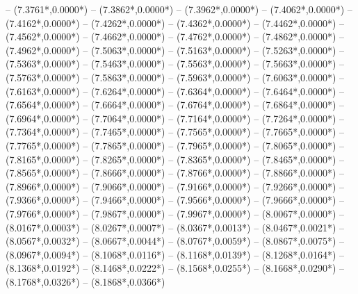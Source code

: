 {	-- ({7.3761*\dx},{0.0000*\dy})
	-- ({7.3862*\dx},{0.0000*\dy})
	-- ({7.3962*\dx},{0.0000*\dy})
	-- ({7.4062*\dx},{0.0000*\dy})
	-- ({7.4162*\dx},{0.0000*\dy})
	-- ({7.4262*\dx},{0.0000*\dy})
	-- ({7.4362*\dx},{0.0000*\dy})
	-- ({7.4462*\dx},{0.0000*\dy})
	-- ({7.4562*\dx},{0.0000*\dy})
	-- ({7.4662*\dx},{0.0000*\dy})
	-- ({7.4762*\dx},{0.0000*\dy})
	-- ({7.4862*\dx},{0.0000*\dy})
	-- ({7.4962*\dx},{0.0000*\dy})
	-- ({7.5063*\dx},{0.0000*\dy})
	-- ({7.5163*\dx},{0.0000*\dy})
	-- ({7.5263*\dx},{0.0000*\dy})
	-- ({7.5363*\dx},{0.0000*\dy})
	-- ({7.5463*\dx},{0.0000*\dy})
	-- ({7.5563*\dx},{0.0000*\dy})
	-- ({7.5663*\dx},{0.0000*\dy})
	-- ({7.5763*\dx},{0.0000*\dy})
	-- ({7.5863*\dx},{0.0000*\dy})
	-- ({7.5963*\dx},{0.0000*\dy})
	-- ({7.6063*\dx},{0.0000*\dy})
	-- ({7.6163*\dx},{0.0000*\dy})
	-- ({7.6264*\dx},{0.0000*\dy})
	-- ({7.6364*\dx},{0.0000*\dy})
	-- ({7.6464*\dx},{0.0000*\dy})
	-- ({7.6564*\dx},{0.0000*\dy})
	-- ({7.6664*\dx},{0.0000*\dy})
	-- ({7.6764*\dx},{0.0000*\dy})
	-- ({7.6864*\dx},{0.0000*\dy})
	-- ({7.6964*\dx},{0.0000*\dy})
	-- ({7.7064*\dx},{0.0000*\dy})
	-- ({7.7164*\dx},{0.0000*\dy})
	-- ({7.7264*\dx},{0.0000*\dy})
	-- ({7.7364*\dx},{0.0000*\dy})
	-- ({7.7465*\dx},{0.0000*\dy})
	-- ({7.7565*\dx},{0.0000*\dy})
	-- ({7.7665*\dx},{0.0000*\dy})
	-- ({7.7765*\dx},{0.0000*\dy})
	-- ({7.7865*\dx},{0.0000*\dy})
	-- ({7.7965*\dx},{0.0000*\dy})
	-- ({7.8065*\dx},{0.0000*\dy})
	-- ({7.8165*\dx},{0.0000*\dy})
	-- ({7.8265*\dx},{0.0000*\dy})
	-- ({7.8365*\dx},{0.0000*\dy})
	-- ({7.8465*\dx},{0.0000*\dy})
	-- ({7.8565*\dx},{0.0000*\dy})
	-- ({7.8666*\dx},{0.0000*\dy})
	-- ({7.8766*\dx},{0.0000*\dy})
	-- ({7.8866*\dx},{0.0000*\dy})
	-- ({7.8966*\dx},{0.0000*\dy})
	-- ({7.9066*\dx},{0.0000*\dy})
	-- ({7.9166*\dx},{0.0000*\dy})
	-- ({7.9266*\dx},{0.0000*\dy})
	-- ({7.9366*\dx},{0.0000*\dy})
	-- ({7.9466*\dx},{0.0000*\dy})
	-- ({7.9566*\dx},{0.0000*\dy})
	-- ({7.9666*\dx},{0.0000*\dy})
	-- ({7.9766*\dx},{0.0000*\dy})
	-- ({7.9867*\dx},{0.0000*\dy})
	-- ({7.9967*\dx},{0.0000*\dy})
	-- ({8.0067*\dx},{0.0000*\dy})
	-- ({8.0167*\dx},{0.0003*\dy})
	-- ({8.0267*\dx},{0.0007*\dy})
	-- ({8.0367*\dx},{0.0013*\dy})
	-- ({8.0467*\dx},{0.0021*\dy})
	-- ({8.0567*\dx},{0.0032*\dy})
	-- ({8.0667*\dx},{0.0044*\dy})
	-- ({8.0767*\dx},{0.0059*\dy})
	-- ({8.0867*\dx},{0.0075*\dy})
	-- ({8.0967*\dx},{0.0094*\dy})
	-- ({8.1068*\dx},{0.0116*\dy})
	-- ({8.1168*\dx},{0.0139*\dy})
	-- ({8.1268*\dx},{0.0164*\dy})
	-- ({8.1368*\dx},{0.0192*\dy})
	-- ({8.1468*\dx},{0.0222*\dy})
	-- ({8.1568*\dx},{0.0255*\dy})
	-- ({8.1668*\dx},{0.0290*\dy})
	-- ({8.1768*\dx},{0.0326*\dy})
	-- ({8.1868*\dx},{0.0366*\dy})
}
